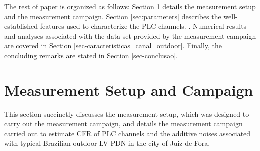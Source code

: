 \documentclass[journal]{IEEEtran}
\begin{document}

The rest of paper is organized as follows: Section \ref{sec:campaign} \color{blue} details \color{black} the measurement setup and the measurement campaign. \color{black} 
Section \ref{sec:parameters} \color{blue} describes the well-established features  used to characterize the \ac{PLC} channels. \color{black}.
Numerical results and analyses associated with the data set provided by the measurement campaign are covered in  Section \ref{sec-caracteristicas_canal_outdoor}. 
Finally, the concluding remarks are stated in Section \ref{sec-conclusao}.

\section{Measurement Setup and Campaign}
\label{sec:campaign}
\color{blue} This section succinctly discusses the measurement setup, which was designed to carry out the measurement campaign, and details the measurement campaign carried out to estimate \ac{CFR} of \ac{PLC} channels and the additive noises associated with typical Brazilian outdoor \ac{LV-PDN} in the city of Juiz de Fora.\color{black}
\end{document}
